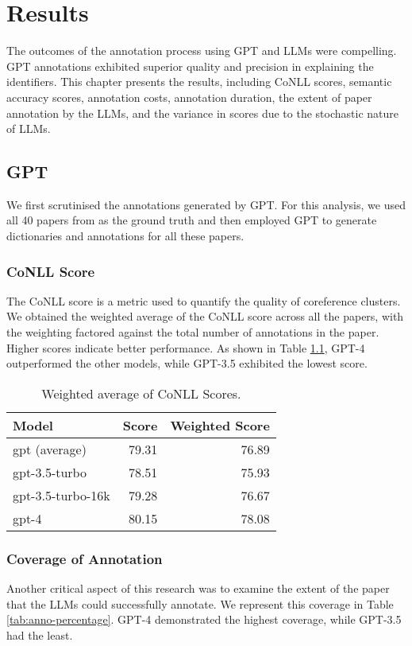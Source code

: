 \chapter{Results}\label{chapter:results}

The outcomes of the annotation process using GPT and LLMs were compelling. GPT annotations exhibited superior quality and precision in explaining the identifiers. This chapter presents the results, including CoNLL scores, semantic accuracy scores, annotation costs, annotation duration, the extent of paper annotation by the LLMs, and the variance in scores due to the stochastic nature of LLMs.

\section{GPT}
We first scrutinised the annotations generated by GPT. For this analysis, we used all 40 papers from \cite{asakura2022building} as the ground truth and then employed GPT to generate dictionaries and annotations for all these papers.

\subsection{CoNLL Score}
The CoNLL score is a metric used to quantify the quality of coreference clusters. We obtained the weighted average of the CoNLL score across all the papers, with the weighting factored against the total number of annotations in the paper. Higher scores indicate better performance. As shown in Table \ref{tab:conll-score}, GPT-4 outperformed the other models, while GPT-3.5 exhibited the lowest score.

\begin{table}[htpb]
  \centering
  \begin{tabular}{lrr}
    \hline
    Model & Score & Weighted Score \\
    \hline
    gpt (average) & 79.31 & 76.89 \\
    gpt-3.5-turbo & 78.51 & 75.93 \\
    gpt-3.5-turbo-16k & 79.28 & 76.67 \\
    gpt-4 & 80.15 & 78.08\\
    \hline
  \end{tabular}
  \caption[CoNLL Scores]{Weighted average of CoNLL Scores.}
  \label{tab:conll-score}
\end{table}


\subsection{Coverage of Annotation}
Another critical aspect of this research was to examine the extent of the paper that the LLMs could successfully annotate. We represent this coverage in Table \ref{tab:anno-percentage}. GPT-4 demonstrated the highest coverage, while GPT-3.5 had the least.

